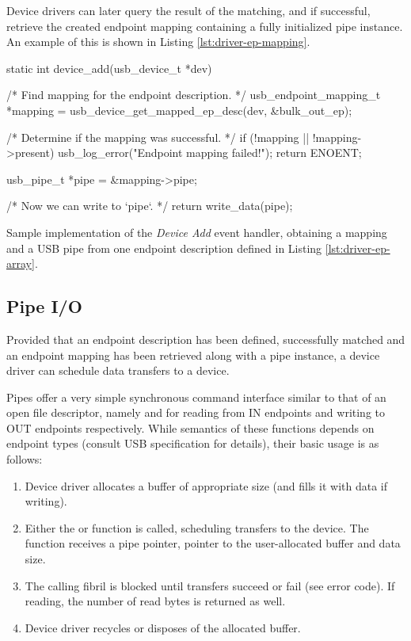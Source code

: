 Device drivers can later query the result of the matching, and if successful,
retrieve the created endpoint mapping containing a fully initialized pipe
instance. An example of this is shown in Listing \ref{lst:driver-ep-mapping}.

\begin{listing}
	\begin{code}
		static int device_add(usb_device_t *dev)
		{
			/* Find mapping for the endpoint description. */
			usb_endpoint_mapping_t *mapping = usb_device_get_mapped_ep_desc(dev, &bulk_out_ep);

			/* Determine if the mapping was successful. */
			if (!mapping || !mapping->present) {
				usb_log_error("Endpoint mapping failed!");
				return ENOENT;
			}

			usb_pipe_t *pipe = &mapping->pipe;

			/* Now we can write to `pipe`. */
			return write_data(pipe);
		}
	\end{code}
	\caption[Obtaining USB pipe from an endpoint description.]{Sample
	implementation of the \textit{Device Add} event handler, obtaining a mapping
	and a USB pipe from one endpoint description defined in Listing
	\ref{lst:driver-ep-array}.}
	\label{lst:driver-ep-mapping}
\end{listing}

\subsection{Pipe I/O}

Provided that an endpoint description has been defined, successfully matched
and an endpoint mapping has been retrieved along with a pipe instance, a device
driver can schedule data transfers to a device.

Pipes offer a very simple synchronous command interface similar to that of an
open file descriptor, namely  and  for
reading from IN endpoints and writing to OUT endpoints
respectively. While semantics of these functions depends on endpoint types
(consult USB specification for details), their basic usage is as follows:
%
\begin{enumerate}
	\item Device driver allocates a buffer of appropriate size (and fills it
		with data if writing).
	\item Either the  or  function is
		called, scheduling transfers to the device. The function receives a pipe
		pointer, pointer to the user-allocated buffer and data size.
	\item The calling fibril is blocked until transfers succeed or fail (see
		error code). If reading, the number of read bytes is returned as well.
	\item Device driver recycles or disposes of the allocated buffer.
\end{enumerate}

